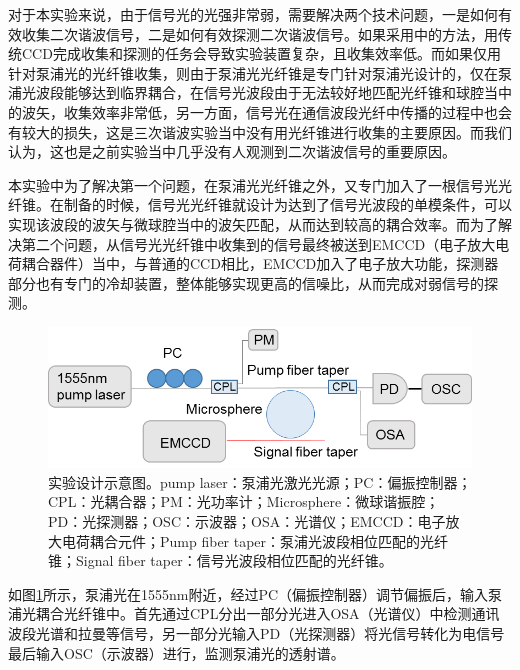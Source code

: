 \documentclass[UTF8,a4paper,cs4size,hyperref]{ctexart}
\begin{document}
对于本实验来说，由于信号光的光强非常弱，需要解决两个技术问题，一是如何有效收集二次谐波信号，二是如何有效探测二次谐波信号。如果采用\cite{carmon2007visible}中的方法，用传统CCD完成收集和探测的任务会导致实验装置复杂，且收集效率低。而如果仅用针对泵浦光的光纤锥收集，则由于泵浦光光纤锥是专门针对泵浦光设计的，仅在泵浦光波段能够达到临界耦合，在信号光波段由于无法较好地匹配光纤锥和球腔当中的波矢，收集效率非常低，另一方面，信号光在通信波段光纤中传播的过程中也会有较大的损失，这是三次谐波实验当中没有用光纤锥进行收集的主要原因。而我们认为，这也是之前实验当中几乎没有人观测到二次谐波信号的重要原因。

本实验中为了解决第一个问题，在泵浦光光纤锥之外，又专门加入了一根信号光光纤锥。在制备的时候，信号光光纤锥就设计为达到了信号光波段的单模条件，可以实现该波段的波矢与微球腔当中的波矢匹配，从而达到较高的耦合效率。而为了解决第二个问题，从信号光光纤锥中收集到的信号最终被送到EMCCD（电子放大电荷耦合器件）当中，与普通的CCD相比，EMCCD加入了电子放大功能，探测器部分也有专门的冷却装置，整体能够实现更高的信噪比，从而完成对弱信号的探测。


\begin{figure}
\centering
\includegraphics[width=16cm ]{ExpSetup.png}
\caption{实验设计示意图。pump laser：泵浦光激光光源；PC：偏振控制器；CPL：光耦合器；PM：光功率计；Microsphere：微球谐振腔；PD：光探测器；OSC：示波器；OSA：光谱仪；EMCCD：电子放大电荷耦合元件；Pump fiber taper：泵浦光波段相位匹配的光纤锥；Signal fiber taper：信号光波段相位匹配的光纤锥。}
\label{pic:ExpSetup}
\end{figure}

如图\ref{pic:ExpSetup}所示，泵浦光在1555nm附近，经过PC（偏振控制器）调节偏振后，输入泵浦光耦合光纤锥中。首先通过CPL分出一部分光进入OSA（光谱仪）中检测通讯波段光谱和拉曼等信号，另一部分光输入PD（光探测器）将光信号转化为电信号最后输入OSC（示波器）进行，监测泵浦光的透射谱。
\end{document}
